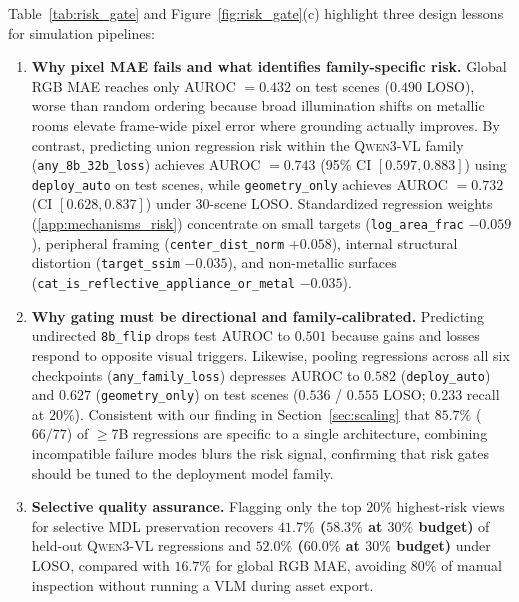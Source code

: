 Table~\ref{tab:risk_gate} and Figure~\ref{fig:risk_gate}(c) highlight three design lessons for simulation pipelines:
\begin{enumerate}
    \item \textbf{Why pixel \textsc{MAE} fails and what identifies family-specific risk.} Global \textsc{RGB MAE} reaches only \textsc{AUROC} $= 0.432$ on test scenes ($0.490$ \textsc{LOSO}), worse than random ordering because broad illumination shifts on metallic rooms elevate frame-wide pixel error where grounding actually improves. By contrast, predicting union regression risk within the \textsc{Qwen3-VL} family (\texttt{any\_8b\_32b\_loss}) achieves \textsc{AUROC} $= \mathbf{0.743}$ (95\% CI $[0.597, 0.883]$) using \texttt{deploy\_auto} on test scenes, while \texttt{geometry\_only} achieves \textsc{AUROC} $= \mathbf{0.732}$ (CI $[0.628, 0.837]$) under 30-scene \textsc{LOSO}. Standardized regression weights (\ref{app:mechanisms_risk}) concentrate on small targets (\texttt{log\_area\_frac} $-0.059$), peripheral framing (\texttt{center\_dist\_\allowbreak norm} $+0.058$), internal structural distortion (\texttt{target\_\allowbreak ssim} $-0.035$), and non-metallic surfaces (\texttt{cat\_is\_\allowbreak reflective\_\allowbreak appliance\_\allowbreak or\_\allowbreak metal} $-0.035$).
    \item \textbf{Why gating must be directional and family-calibrated.} Predicting undirected \texttt{8b\_flip} drops test \textsc{AUROC} to $0.501$ because gains and losses respond to opposite visual triggers. Likewise, pooling regressions across all six checkpoints (\texttt{any\_family\_loss}) depresses \textsc{AUROC} to $0.582$ (\texttt{deploy\_auto}) and $0.627$ (\texttt{geometry\_only}) on test scenes ($0.536$ / $0.555$ \textsc{LOSO}; $0.233$ recall at $20\%$). Consistent with our finding in Section~\ref{sec:scaling} that $85.7\%$ ($66/77$) of $\ge$7B regressions are specific to a single architecture, combining incompatible failure modes blurs the risk signal, confirming that risk gates should be tuned to the deployment model family.
    \item \textbf{Selective quality assurance.} Flagging only the top $20\%$ highest-risk views for selective \textsc{MDL} preservation recovers \textbf{$41.7\%$ ($58.3\%$ at $30\%$ budget)} of held-out \textsc{Qwen3-VL} regressions and \textbf{$52.0\%$ ($60.0\%$ at $30\%$ budget)} under \textsc{LOSO}, compared with $16.7\%$ for global \textsc{RGB MAE}, avoiding $80\%$ of manual inspection without running a VLM during asset export.
\end{enumerate}
